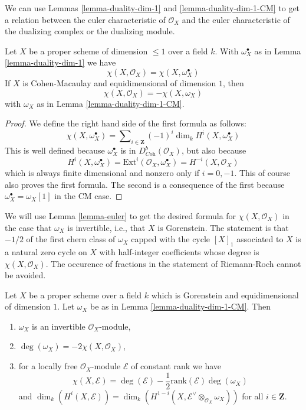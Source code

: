 \noindent
We can use Lemmas \ref{lemma-duality-dim-1} and \ref{lemma-duality-dim-1-CM}
to get a relation between the euler
characteristic of $\mathcal{O}_X$ and the euler characteristic
of the dualizing complex or the dualizing module.

\begin{lemma}
\label{lemma-euler}
Let $X$ be a proper scheme of dimension $\leq 1$ over a field $k$.
With $\omega_X^\bullet$ as in Lemma \ref{lemma-duality-dim-1} we have
$$
\chi(X, \mathcal{O}_X) = \chi(X, \omega_X^\bullet)
$$
If $X$ is Cohen-Macaulay and equidimensional of dimension $1$, then
$$
\chi(X, \mathcal{O}_X) = - \chi(X, \omega_X)
$$
with $\omega_X$ as in Lemma \ref{lemma-duality-dim-1-CM}.
\end{lemma}

\begin{proof}
We define the right hand side of the first formula as follows:
$$
\chi(X, \omega_X^\bullet) =
\sum\nolimits_{i \in \mathbf{Z}} (-1)^i\dim_k H^i(X, \omega_X^\bullet)
$$
This is well defined because $\omega_X^\bullet$ is in
$D^b_{\textit{Coh}}(\mathcal{O}_X)$, but also because
$$
H^i(X, \omega_X^\bullet) =
\text{Ext}^i(\mathcal{O}_X, \omega_X^\bullet) =
H^{-i}(X, \mathcal{O}_X)
$$
which is always finite dimensional and nonzero only if $i = 0, -1$.
This of course also proves the first formula. The second is a consequence
of the first because $\omega_X^\bullet = \omega_X[1]$ in the CM case.
\end{proof}

\noindent
We will use Lemma \ref{lemma-euler} to get the desired formula for
$\chi(X, \mathcal{O}_X)$ in the case that $\omega_X$ is
invertible, i.e., that $X$ is Gorenstein.
The statement is that $-1/2$ of the first chern class of $\omega_X$
capped with the cycle $[X]_1$ associated to $X$ is a natural zero
cycle on $X$ with half-integer coefficients whose degree is
$\chi(X, \mathcal{O}_X)$.
The occurence of fractions in the statement of Riemann-Roch cannot
be avoided.

\begin{lemma}
\label{lemma-rr}
Let $X$ be a proper scheme over a field $k$ which is Gorenstein and
equidimensional of dimension $1$. Let $\omega_X$ be as in
Lemma \ref{lemma-duality-dim-1-CM}. Then
\begin{enumerate}
\item $\omega_X$ is an invertible $\mathcal{O}_X$-module,
\item $\deg(\omega_X) = -2\chi(X, \mathcal{O}_X)$,
\item for a locally free $\mathcal{O}_X$-module $\mathcal{E}$
of constant rank we have
$$
\chi(X, \mathcal{E}) = \deg(\mathcal{E}) -
\textstyle{\frac{1}{2}} \text{rank}(\mathcal{E}) \deg(\omega_X)
$$
and $\dim_k(H^i(X, \mathcal{E})) =
\dim_k(H^{1 - i}(X, \mathcal{E}^\vee \otimes_{\mathcal{O}_X} \omega_X))$
for all $i \in \mathbf{Z}$.
\end{enumerate}
\end{lemma}

